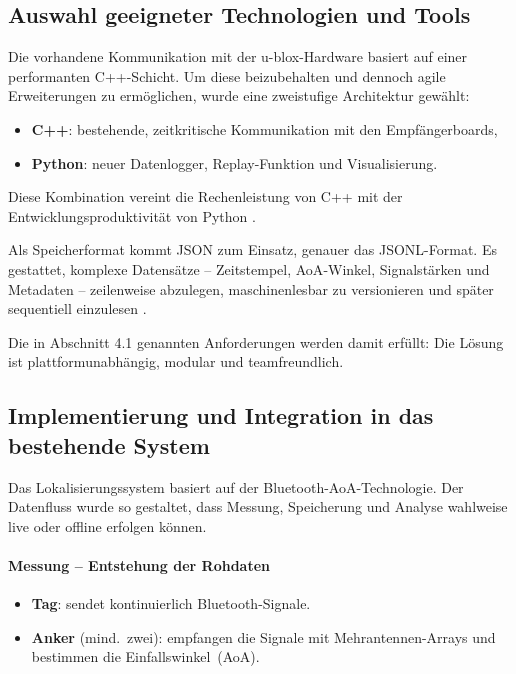\documentclass[a4paper, 12pt]{article} %
\begin{document}
\subsection{Auswahl geeigneter Technologien und Tools}
Die vorhandene Kommunikation mit der u-blox-Hardware basiert auf einer performanten \mbox{C++-Schicht}.  
Um diese beizubehalten und dennoch agile Erweiterungen zu ermöglichen, wurde eine zweistufige Architektur gewählt:

\begin{itemize}[leftmargin=2em]
  \item \textbf{C++}: bestehende, zeitkritische Kommunikation mit den Empfängerboards,  
  \item \textbf{Python}: neuer Datenlogger, Replay-Funktion und Visualisierung.
\end{itemize}

Diese Kombination vereint die Rechenleistung von C++ mit der Entwicklungsproduktivität von Python \cite{cpp_python_integration}.

Als Speicherformat kommt \ac{JSON} zum Einsatz, genauer das \acf{JSONL}-Format.  
Es gestattet, komplexe Datensätze – Zeitstempel, \ac{AoA}-Winkel, Signalstärken und Metadaten – zeilenweise abzulegen, maschinenlesbar zu 
versionieren und später sequentiell einzulesen \cite{json_logging_bestpractices}.  

Die in Abschnitt 4.1 genannten Anforderungen werden damit erfüllt: Die Lösung ist plattformunabhängig, modular 
und teamfreundlich.

\subsection{Implementierung und Integration in das bestehende System}
Das Lokalisierungssystem basiert auf der Bluetooth-\ac{AoA}-Technologie.  
Der Datenfluss wurde so gestaltet, dass Messung, Speicherung und Analyse wahlweise live oder offline erfolgen können.

\paragraph{Messung – Entstehung der Rohdaten}
\begin{itemize}[leftmargin=2em]
  \item \textbf{Tag}: sendet kontinuierlich Bluetooth-Signale.  
  \item \textbf{Anker} (mind.\ zwei): empfangen die Signale mit Mehrantennen-Arrays und bestimmen die Einfallswinkel~(\ac{AoA}).
\end{itemize}
\end{document}

